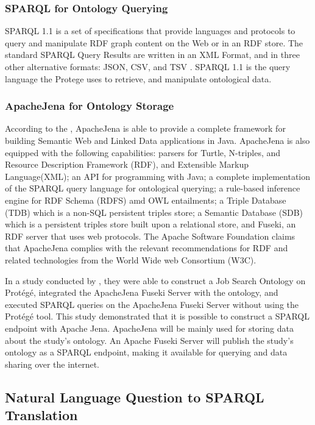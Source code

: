 \subsubsection{SPARQL for Ontology Querying}
SPARQL 1.1 is a set of specifications that provide languages and protocols to query and manipulate RDF graph content on the Web or in an RDF store. The standard SPARQL Query Results are written in an XML Format, and in three other alternative formats: JSON, CSV, and TSV \cite{picalausa2011real}. SPARQL 1.1 is the query language the Protege uses to retrieve, and manipulate ontological data.

\subsubsection{ApacheJena for Ontology Storage}

According to the , ApacheJena is able to provide a complete framework for building Semantic Web and Linked Data applications in Java. ApacheJena is also equipped with the following capabilities: parsers for Turtle, N-triples, and Resource Description Framework (RDF), and Extensible Markup Language(XML); an API for programming with Java; a complete implementation of the SPARQL query language for ontological querying; a rule-based inference engine for RDF Schema (RDFS) amd OWL entailments; a Triple Database (TDB) which is a non-SQL persistent triples store; a Semantic Database (SDB) which is a persistent triples store built upon a relational store, and Fuseki, an RDF server that uses web protocols. The Apache Software Foundation claims that ApacheJena complies with the relevant recommendations for RDF and related technologies from the World Wide web Consortium (W3C). 

In a study conducted by , they were able to construct a Job Search Ontology on Protégé, integrated the ApacheJena Fuseki Server with the ontology, and executed SPARQL queries on the ApacheJena Fuseki Server without using the Protégé tool. This study demonstrated that it is possible to construct a SPARQL endpoint with Apache Jena. ApacheJena will be mainly used for storing data about the study’s ontology.  An Apache Fuseki Server will publish the study’s ontology as a SPARQL endpoint, making it available for querying and data sharing over the internet. 

\subsection{Natural Language Question to SPARQL Translation}


